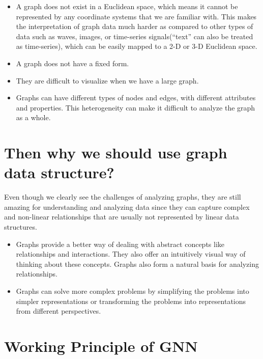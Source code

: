 \documentclass[
]{article}
\begin{document}
\begin{itemize}
\item
  A graph does not exist in a Euclidean space, which means it cannot be
  represented by any coordinate systems that we are familiar with. This
  makes the interpretation of graph data much harder as compared to
  other types of data such as waves, images, or time-series
  signals(``text'' can also be treated as time-series), which can be
  easily mapped to a 2-D or 3-D Euclidean space.
\item
  A graph does not have a fixed form.
\item
  They are difficult to visualize when we have a large graph.
\item
  Graphs can have different types of nodes and edges, with different
  attributes and properties. This heterogeneity can make it difficult to
  analyze the graph as a whole.
\end{itemize}

\hypertarget{then-why-we-should-use-graph-data-structure}{%
\section{Then why we should use graph data
structure?}\label{then-why-we-should-use-graph-data-structure}}

Even though we clearly see the challenges of analyzing graphs, they are
still amazing for understanding and analyzing data since they can
capture complex and non-linear relationships that are usually not
represented by linear data structures.

\begin{itemize}
\item
  Graphs provide a better way of dealing with abstract concepts like
  relationships and interactions. They also offer an intuitively visual
  way of thinking about these concepts. Graphs also form a natural basis
  for analyzing relationships.
\item
  Graphs can solve more complex problems by simplifying the problems
  into simpler representations or transforming the problems into
  representations from different perspectives.
\end{itemize}

\hypertarget{working-principle-of-gnn}{%
\section{Working Principle of GNN}\label{working-principle-of-gnn}}
\end{document}
